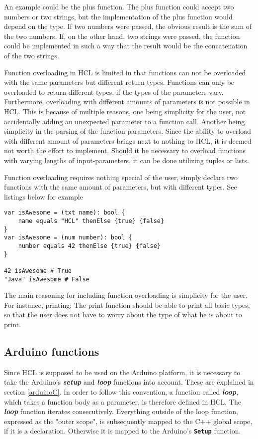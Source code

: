 An example could be the plus function. 
The plus function could accept two numbers or two strings, but the implementation of the plus function would depend on the type.
If two numbers were passed, the obvious result is the sum of the two numbers.
If, on the other hand, two strings were passed, the function could be implemented in such a way that the result would be the concatenation of the two strings.

Function overloading in HCL is limited in that functions can not be overloaded with the same parameters but different return types. 
Functions can only be overloaded to return different types, if the types of the parameters vary.
Furthermore, overloading with different amounts of parameters is not possible in HCL.
This is because of multiple reasons, one being simplicity for the user, not accidentally adding an unexpected parameter to a function call. 
Another being simplicity in the parsing of the function parameters. 
Since the ability to overload with different amount of parameters brings next to nothing to HCL, it is deemed not worth the effort to implement.
Should it be necessary to overload functions with varying lengths of input-parameters, it can be done utilizing tuples or lists.

Function overloading requires nothing special of the user, simply declare two functions with the same amount of parameters, but with different types. 
See listings below for example

\begin{lstlisting}[language=HCL,label=lis:hclEqualsThenElse,firstnumber=1]
var isAwesome = (txt name): bool {
	name equals "HCL" thenElse {true} {false}
}
var isAwesome = (num number): bool {
	number equals 42 thenElse {true} {false}
}

42 isAwesome # True
"Java" isAwesome # False
\end{lstlisting}

The main reasoning for including function overloading is simplicity for the user.
For instance, printing; 
The print function should be able to print all basic types, so that the user does not have to worry about the type of what he is about to print.

\subsection{Arduino functions}
Since HCL is supposed to be used on the Arduino platform, it is necessary to take the Arduino's \textbf{\textit{setup}} and \textbf{\textit{loop}} functions into account. 
These are explained in section \ref{arduinoC}.
In order to follow this convention, a function called \textbf{\textit{loop}}, which takes a function body as a parameter, is therefore defined in HCL.
The \textbf{\textit{loop}} function iterates consecutively.
Everything outside of the loop function, expressed as the "outer scope", is subsequently mapped to the C++ global scope, if it is a declaration.
Otherwise it is mapped to the Arduino's \textbf{\texttt{Setup}} function.

